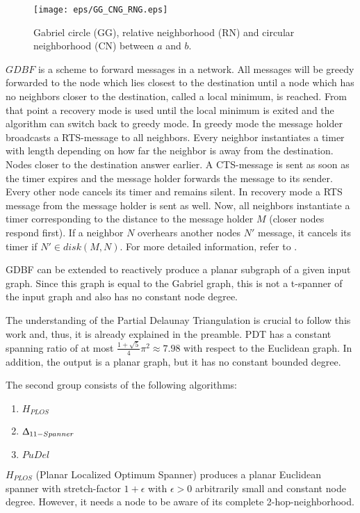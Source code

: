 \begin{figure}[h!]
\centering
\texttt{[image: eps/GG\_CNG\_RNG.eps]}
\caption{Gabriel circle (GG), relative neighborhood (RN) and circular neighborhood (CN) between $a $ and $b $.}
\label{fig:GG_CNG_RNG}
\end{figure}

$GDBF $ is a scheme to forward messages in a network.
All messages will be greedy forwarded to the node which lies closest to the destination until a node which has no neighbors closer to the destination, called a local minimum, is reached.
From that point a recovery mode is used until the local minimum is exited and the algorithm can switch back to greedy mode.
In greedy mode the message holder broadcasts a RTS-message to all neighbors.
Every neighbor instantiates a timer with length depending on how far the neighbor is away from the destination. 
Nodes closer to the destination answer earlier.
A CTS-message is sent as soon as the timer expires and the message holder forwards the message to its sender. 
Every other node cancels its timer and remains silent.
In recovery mode a RTS message from the message holder is sent as well.
Now, all neighbors instantiate a timer corresponding to the distance to the message holder $M $ (closer nodes respond first).
If a neighbor $N $ overhears another nodes $N' $ message, it cancels its timer if $N' \in disk(M, N) $.
For more detailed information, refer to \cite{Chawla2006}.

GDBF can be extended to reactively produce a planar subgraph of a given input graph. 
Since this graph is equal to the Gabriel graph, this is not a t-spanner of the input graph and also has no constant node degree.

The understanding of the Partial Delaunay Triangulation is crucial to follow this work and, thus, it is already explained in the preamble.
PDT has a constant spanning ratio of at most $\frac{1+\sqrt{5}}{4}\pi^2 \approx 7.98 $ with respect to the Euclidean graph.
In addition, the output is a planar graph, but it has no constant bounded degree.


The second group consists of the following algorithms:
\begin{enumerate}
\item $H_{PLOS} $
\item $\Updelta _{11-Spanner} $
\item $PuDel $
\end{enumerate}

$H_{PLOS} $ (Planar Localized Optimum Spanner)\cite{Damian2010} produces a planar Euclidean spanner with stretch-factor $1+ \epsilon $ with $\epsilon >0 $ arbitrarily small and constant node degree.
However, it needs a node to be aware of its complete 2-hop-neighborhood.

